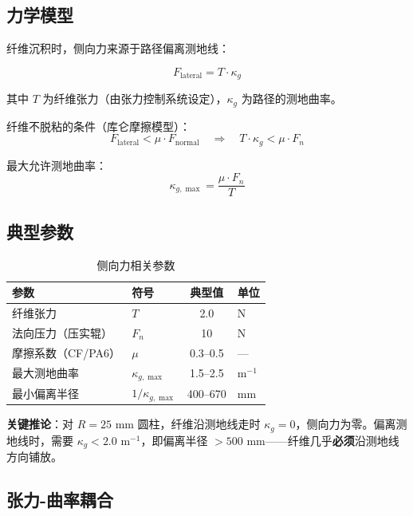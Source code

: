 \documentclass[11pt,a4paper]{article}
\begin{document}
\subsection{力学模型}

纤维沉积时，侧向力来源于路径偏离测地线：

\begin{equation}
\boxed{F_{\text{lateral}} = T \cdot \kappa_g}
\end{equation}

其中 $T$ 为纤维张力（由张力控制系统设定），$\kappa_g$ 为路径的测地曲率。

纤维不脱粘的条件（库仑摩擦模型）：
\begin{equation}
F_{\text{lateral}} < \mu \cdot F_{\text{normal}}
\quad\Longrightarrow\quad
T \cdot \kappa_g < \mu \cdot F_n
\end{equation}

最大允许测地曲率：
\begin{equation}
\kappa_{g,\max} = \frac{\mu \cdot F_n}{T}
\end{equation}

\subsection{典型参数}

\begin{table}[H]
\centering
\begin{tabular}{llcl}
\toprule
\textbf{参数} & \textbf{符号} & \textbf{典型值} & \textbf{单位} \\
\midrule
纤维张力 & $T$ & 2.0 & N \\
法向压力（压实辊） & $F_n$ & 10 & N \\
摩擦系数（CF/PA6） & $\mu$ & 0.3--0.5 & — \\
最大测地曲率 & $\kappa_{g,\max}$ & 1.5--2.5 & m$^{-1}$ \\
最小偏离半径 & $1/\kappa_{g,\max}$ & 400--670 & mm \\
\bottomrule
\end{tabular}
\caption{侧向力相关参数}
\end{table}

\textcolor{accent}{\textbf{关键推论}}：对 $R=25$ mm 圆柱，纤维沿测地线走时 $\kappa_g = 0$，侧向力为零。偏离测地线时，需要 $\kappa_g < 2.0$ m$^{-1}$，即偏离半径 $> 500$ mm——纤维几乎\textbf{必须}沿测地线方向铺放。

\subsection{张力-曲率耦合}
\end{document}
